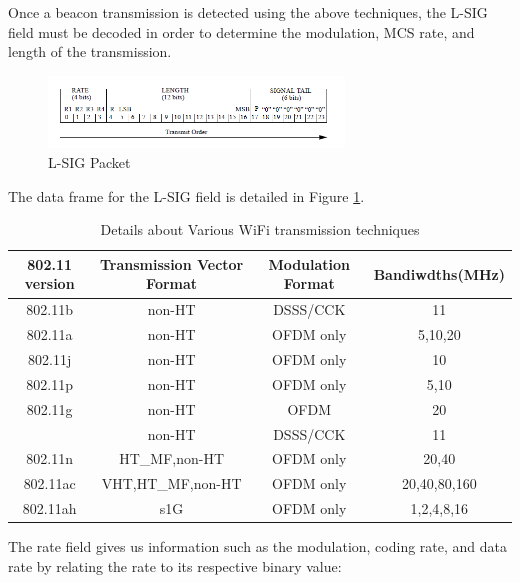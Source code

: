 Once a beacon transmission is detected using the above techniques, the L-SIG field must be decoded in order to determine the modulation, MCS rate, and length of the transmission.
\begin{figure}[ht!]
	\centering
	\includegraphics[width=0.70\textwidth]{img/lsig_packet}
	\caption{L-SIG Packet}
	\label{fig:lsig_packet}
\end{figure}\par
 The data frame for the L-SIG field is detailed in Figure \ref{fig:lsig_packet}.
\begin{table}[ht!]
	\centering
	\begin{tabular}{|c|c|c|c|}
		\hline
		802.11 version & Transmission Vector Format & Modulation Format & Bandiwdths(MHz) \\
		\hline
		802.11b & non-HT & DSSS/CCK  & 11 \\
		802.11a & non-HT & OFDM only & 5,10,20 \\
		802.11j & non-HT & OFDM only & 10 \\
		802.11p & non-HT & OFDM only & 5,10 \\
		802.11g & non-HT & OFDM      & 20 \\
			    & non-HT & DSSS/CCK  & 11 \\
		802.11n & HT\_MF,non-HT & OFDM only & 20,40 \\
		802.11ac & VHT,HT\_MF,non-HT & OFDM only & 20,40,80,160 \\
		802.11ah & s1G & OFDM only & 1,2,4,8,16 \\
		\hline
	\end{tabular}
	\caption{Details about Various WiFi transmission techniques}
	\label{table:WiFi_table}
\end{table} \par
The rate field gives us information such as the modulation, coding rate, and data rate by relating the rate to its respective binary value:

